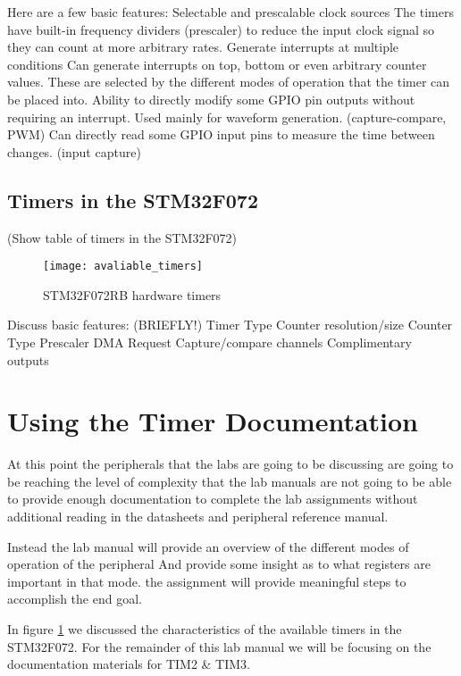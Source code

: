 \documentclass[11pt,fleqn]{book} %
\begin{document}
        Here are a few basic features:
            Selectable and prescalable clock sources
                The timers have built-in frequency dividers (prescaler) to reduce the input clock signal so they can count at more arbitrary rates. 
            Generate interrupts at multiple conditions 
                Can generate interrupts on top, bottom or even arbitrary counter values. 
                These are selected by the different modes of operation that the timer can be placed into. 
        Ability to directly modify some GPIO pin outputs without requiring an interrupt. Used mainly for waveform generation. (capture-compare, PWM)
        Can directly read some GPIO input pins to measure the time between changes. (input capture)	
    
    \subsection{Timers in the STM32F072}
        (Show table of timers in the STM32F072)
        \begin{figure}[]
            \centering\texttt{[image: avaliable\_timers]}
            \caption{STM32F072RB hardware timers}
            \label{avaliable_timers}
        \end{figure}
        
        Discuss basic features: (BRIEFLY!)
            Timer Type
            Counter resolution/size
            Counter Type
            Prescaler
            DMA Request
            Capture/compare channels
            Complimentary outputs
    

\section{Using the Timer Documentation}
    At this point the peripherals that the labs are going to be discussing are going to be reaching the level of complexity that the lab manuals are not going to be able to provide enough documentation to complete the lab assignments without additional reading in the datasheets and peripheral reference manual. 
    
    Instead the lab manual will provide an overview of the different modes of operation of the peripheral And provide some insight as to what registers are important in that mode. the assignment will provide meaningful steps to accomplish the end goal. 

    In figure \ref{avaliable_timers} we discussed the characteristics of the available timers in the STM32F072. For the remainder of this lab manual we will be focusing on the documentation materials for TIM2 \& TIM3. 
    
\end{document}
